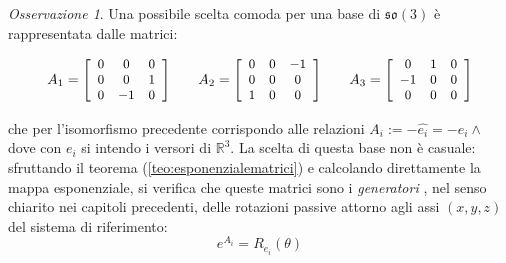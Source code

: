 \documentclass[11pt]{report}
\theoremstyle{plain}
\theoremstyle{definition}
\theoremstyle{remark}
\newtheorem{oss}{Osservazione}
\begin{document}
\begin{oss}
Una possibile scelta comoda per una base di $\mathfrak{so(3)}$ è rappresentata dalle matrici:

\begin{equation}\label{def:basealgebraa}\small
A_{1} = \left[ \begin{array}{ccc}
0 & 0 &0  \\
0 & 0 & 1 \\
0 & -1 & 0 \\
\end{array} \right]
\qquad
A_{2} = \left[ \begin{array}{ccc}
0 & 0 & -1  \\
0 & 0 & 0 \\
1 & 0 & 0 \\
\end{array} \right]
\qquad
A_{3} = \left[ \begin{array}{ccc}
0 & 1 & 0  \\
-1 & 0 & 0 \\
0 & 0 & 0 \\
\end{array} \right]
\end{equation}

che per l'isomorfismo precedente corrispondo alle relazioni $ A_{i} := -\hat{e_{i}} = -e_{i} \wedge$ dove con $e_{i}$ si intendo i versori di $\mathbb{R}^{3}$.
La scelta di questa base non è casuale: sfruttando il teorema (\ref{teo:esponenzialematrici}) e calcolando direttamente la mappa esponenziale, si verifica che queste matrici sono i \emph{generatori} , nel senso chiarito nei capitoli precedenti, delle rotazioni passive attorno agli assi $(x,y,z)$ del sistema di riferimento:
$$e^{A_{i}} = R_{e_{i}}(\theta) $$

\end{oss}
 
\end{document}
